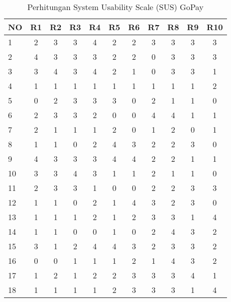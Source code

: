 \begin{table}[hbt!]
    \begin{threeparttable}
        \caption{Perhitungan System Usability Scale (SUS) GoPay}
        \label{tabel:sus_gopay}
        \begin{tabular}{l*{10}{c}}
            \toprule
            \textbf{NO} & \textbf{R1} & \textbf{R2} & \textbf{R3} & \textbf{R4} & \textbf{R5} & \textbf{R6} & \textbf{R7} & \textbf{R8} & \textbf{R9} & \textbf{R10} \\
            \midrule
            1  & 2 & 3 & 3 & 4 & 2 & 2 & 3 & 3 & 3 & 3 \\
            \hline
            2  & 4 & 3 & 3 & 3 & 2 & 2 & 0 & 3 & 3 & 3 \\
            \hline
            3  & 3 & 4 & 3 & 4 & 2 & 1 & 0 & 3 & 3 & 1 \\
            \hline
            4  & 1 & 1 & 1 & 1 & 1 & 1 & 1 & 1 & 1 & 2 \\
            \hline
            5  & 0 & 2 & 3 & 3 & 3 & 0 & 2 & 1 & 1 & 0 \\
            \hline
            6  & 2 & 3 & 3 & 2 & 0 & 0 & 4 & 4 & 1 & 1 \\
            \hline
            7  & 2 & 1 & 1 & 1 & 2 & 0 & 1 & 2 & 0 & 1 \\
            \hline
            8  & 1 & 1 & 0 & 2 & 4 & 3 & 2 & 2 & 3 & 0 \\
            \hline
            9  & 4 & 3 & 3 & 3 & 4 & 4 & 2 & 2 & 1 & 1 \\
            \hline
            10 & 3 & 3 & 4 & 3 & 1 & 1 & 2 & 1 & 1 & 0 \\
            \hline
            11 & 2 & 3 & 3 & 1 & 0 & 0 & 2 & 2 & 3 & 3 \\
            \hline
            12 & 1 & 1 & 0 & 2 & 1 & 4 & 3 & 2 & 3 & 0 \\
            \hline
            13 & 1 & 1 & 1 & 2 & 1 & 2 & 3 & 3 & 1 & 4 \\
            \hline
            14 & 1 & 1 & 0 & 0 & 1 & 0 & 2 & 4 & 3 & 2 \\
            \hline
            15 & 3 & 1 & 2 & 4 & 4 & 3 & 2 & 3 & 3 & 2 \\
            \hline
            16 & 0 & 0 & 1 & 1 & 1 & 2 & 1 & 4 & 3 & 2 \\
            \hline
            17 & 1 & 2 & 1 & 2 & 2 & 3 & 3 & 3 & 4 & 1 \\
            \hline
            18 & 1 & 1 & 1 & 1 & 2 & 3 & 3 & 3 & 1 & 4 \\

\end{tabular}
\end{threeparttable}
\end{table}
